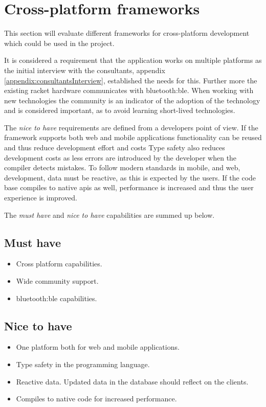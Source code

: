 \section{Cross-platform frameworks}

This section will evaluate different frameworks for cross-platform development which could be used in the project.

It is considered a requirement that the application works on multiple platforms as the initial interview with the consultants, appendix \ref{appendix:consultantsInterview}, established the needs for this. Further more the existing racket hardware communicates with \gls{bluetooth:ble}.
When working with new technologies the community is an indicator of the adoption of the technology and is considered important, as to avoid learning short-lived technologies.

The \textit{nice to have} requirements are defined from a developers point of view. 
If the framework supports both web and mobile applications functionality can be reused and thus reduce development effort and costs
Type safety also reduces development costs as less errors are introduced by the developer when the compiler detects mistakes.
To follow modern standards in mobile, and web, development, data must be reactive, as this is expected by the users.
If the code base compiles to native \glspl{api} as well, performance is increased and thus the user experience is improved.

The \textit{must have} and \textit{nice to have} capabilities are summed up below.
	
\subsection*{Must have}
\begin{itemize}
	\item Cross platform capabilities.
	\item Wide community support.
	\item \gls{bluetooth:ble} capabilities.
\end{itemize}
	
\subsection*{Nice to have}
\begin{itemize}
	\item One platform both for web and mobile applications.
	\item Type safety in the programming language.
	\item Reactive data. Updated data in the database should reflect on the clients.
	\item Compiles to native code for increased performance.
\end{itemize}
	
